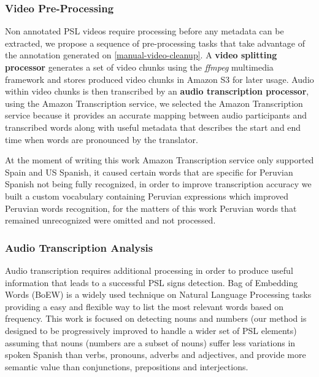 \documentclass[twocolumn,conference]{article}
\begin{document}
\subsubsection{Video Pre-Processing}\label{video-pre-processing}
Non annotated PSL videos require processing before any metadata can be extracted, we propose a sequence of pre-processing tasks that take advantage of the annotation generated on \ref{manual-video-cleanup}. A \textbf{video splitting processor} generates a set of video chunks using the \textit{ffmpeg} multimedia framework and stores produced video chunks in Amazon S3 for later usage. Audio within video chunks is then transcribed by an \textbf{audio transcription processor}, using the Amazon Transcription service, we selected the Amazon Transcription service because it provides an accurate mapping between audio participants and transcribed words along with useful metadata that describes the start and end time when words are pronounced by the translator. 

At the moment of writing this work Amazon Transcription service only supported Spain and US Spanish, it caused certain words that are specific for Peruvian Spanish not being fully recognized, in order to improve transcription accuracy we built a custom vocabulary containing Peruvian expressions which improved  Peruvian words recognition, for the matters of this work Peruvian words that remained unrecognized were omitted and not processed.

\subsubsection{Audio Transcription Analysis}\label{audio-transcription-analysis}
Audio transcription requires additional processing in order to produce useful information that leads to a successful PSL signs detection. Bag of Embedding Words (BoEW) is a widely used technique on Natural Language Processing tasks providing a easy and flexible way to list the most relevant words based on frequency. This work is focused on detecting nouns and numbers (our method is designed to be progressively improved to handle a wider set of PSL elements) assuming that nouns (numbers are a subset of nouns) suffer less variations in spoken Spanish than verbs, pronouns, adverbs and adjectives, and provide more semantic value than conjunctions, prepositions and interjections. 
\end{document}
